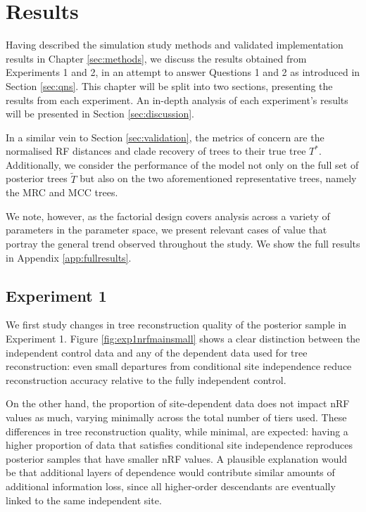 \chapter{Results}
\label{sec:results}

Having described the simulation study methods and validated implementation results in Chapter \ref{sec:methods}, we discuss the results obtained from Experiments 1 and 2, in an attempt to answer Questions 1 and 2 as introduced in Section \ref{sec:qns}. This chapter will be split into two sections, presenting the results from each experiment. An in-depth analysis of each experiment's results will be presented in Section \ref{sec:discussion}.

In a similar vein to Section \ref{sec:validation}, the metrics of concern are the normalised RF distances and clade recovery of trees to their true tree $T^*$. Additionally, we consider the performance of the model not only on the full set of posterior trees $\tilde{T}$ but also on the two aforementioned representative trees, namely the MRC and MCC trees.

We note, however, as the factorial design covers analysis across a variety of parameters in the parameter space, we present relevant cases of value that portray the general trend observed throughout the study. We show the full results in Appendix \ref{app:fullresults}.

\section{Experiment 1}
\label{sec:exp1results}
We first study changes in tree reconstruction quality of the posterior sample in Experiment 1. Figure \ref{fig:exp1nrfmainsmall} shows a clear distinction between the independent control data and any of the dependent data used for tree reconstruction: even small departures from conditional site independence reduce reconstruction accuracy relative to the fully independent control. 

On the other hand, the proportion of site-dependent data does not impact nRF values as much, varying minimally across the total number of tiers used. These differences in tree reconstruction quality, while minimal, are expected: having a higher proportion of data that satisfies conditional site independence reproduces posterior samples that have smaller nRF values. A plausible explanation would be that additional layers of dependence would contribute similar amounts of additional information loss, since all higher-order descendants are eventually linked to the same independent site.

